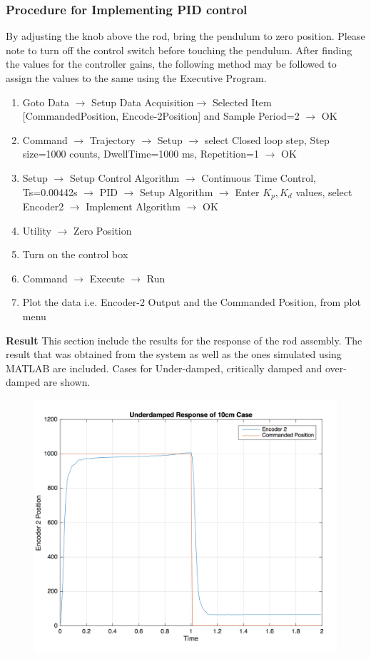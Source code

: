 \documentclass[12pt, a4paper]{article}
\begin{document}
\subsubsection{Procedure for Implementing PID control}
By adjusting the knob above the rod, bring the pendulum to zero position. Please note to turn off the control switch before touching the pendulum. After finding the values for the controller gains, the following method may be followed to assign the values to the same using the Executive Program.
\begin{enumerate}
\item Goto Data $\rightarrow$ Setup Data Acquisition$\rightarrow$ Selected Item [CommandedPosition, Encode-2Position] and Sample Period=2 $\rightarrow$ OK
\item Command $\rightarrow$ Trajectory $\rightarrow$ Setup $\rightarrow$ select Closed loop step, Step size=1000 counts, DwellTime=1000 ms, Repetition=1 $\rightarrow$ OK
\item Setup $\rightarrow$ Setup Control Algorithm $\rightarrow$ Continuous Time Control, Ts=0.00442s $\rightarrow$ PID $\rightarrow$ Setup Algorithm $\rightarrow$ Enter $K_p, K_d$ values, select Encoder2 $\rightarrow$ Implement Algorithm $\rightarrow$ OK
\item Utility $\rightarrow$ Zero Position
\item Turn on the control box
\item Command $\rightarrow$ Execute $\rightarrow$ Run
\item Plot the data i.e. Encoder-2 Output and the Commanded Position, from plot menu
\end{enumerate}
\textbf{Result} This section include the results for the response of the rod assembly. The result that was obtained from the system as well as the ones simulated using MATLAB are included. Cases for Under-damped, critically damped and over-damped are shown.
\begin{figure}[H]
\centering
\includegraphics[width = \textwidth]{ud_m1.png}
\end{figure}
\end{document}
